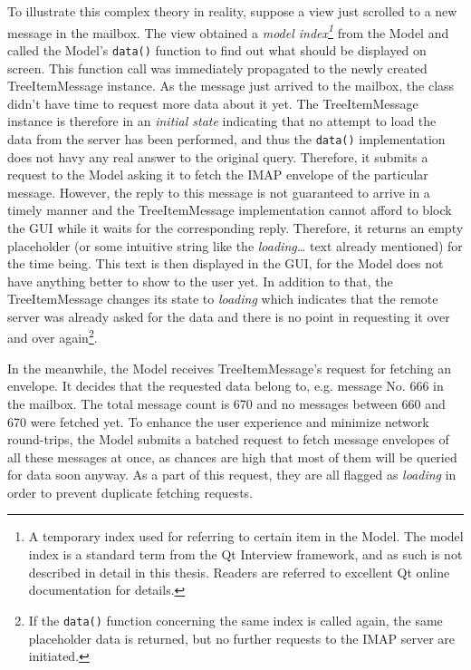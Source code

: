 \documentclass[12pt,notitlepage]{report}
\begin{document}
To illustrate this complex theory in reality, suppose a view just scrolled to a
new message in the mailbox.  The view obtained a {\em model index\footnote{A
temporary index used for referring to certain item in the Model.  The model
index is a standard term from the Qt Interview framework, and as such is not
described in detail in this thesis.  Readers are referred to excellent Qt online
documentation for details.}} from the Model and called the Model's {\tt data()}
function to find out what should be displayed on screen.  This function call was
immediately propagated to the newly created TreeItemMessage instance.  As the
message just arrived to the mailbox, the class didn't have time to request more
data about it yet.  The TreeItemMessage instance is therefore in an {\em initial
state} indicating that no attempt to load the data from the server has been
performed, and thus the {\tt data()} implementation does not havy any real
answer to the original query.  Therefore, it submits a request to the Model
asking it to fetch the IMAP envelope of the particular message.  However, the reply to this
message is not guaranteed to arrive in a timely manner and the TreeItemMessage
implementation cannot afford to block the GUI while it waits for the
corresponding reply.  Therefore, it returns an empty placeholder (or some
intuitive string like the {\em loading\ldots} text already mentioned) for the
time being.  This text is then displayed in the GUI, for the Model does not have
anything better to show to the user yet.  In addition to that, the
TreeItemMessage changes its state to {\em loading} which indicates that the
remote server was already asked for the data and there is no point in requesting
it over and over again\footnote{If the {\tt data()} function concerning the same
index is called again, the same placeholder data is returned, but no further
requests to the IMAP server are initiated.}.

In the meanwhile, the Model receives TreeItemMessage's request for fetching an
envelope.  It decides that the requested data belong to, e.g. message No. 666 in
the mailbox. The total message count is 670 and no messages between 660
and 670 were fetched yet.  To enhance the user experience and minimize network
round-trips, the Model submits a batched request to fetch message envelopes of all these
messages at once, as chances are high that most of them will be queried for data soon
anyway.  As a part of this request, they are all flagged as {\em loading} in
order to prevent duplicate fetching requests.
\end{document}
